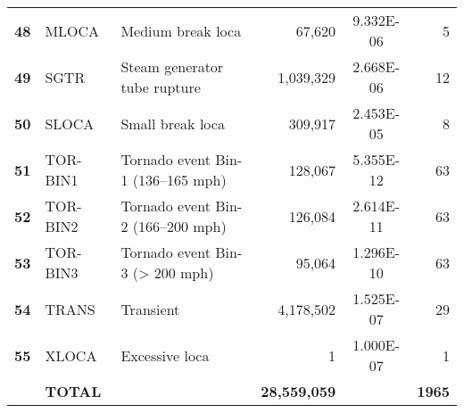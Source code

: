 \begin{longtable}{@{}lllrSr@{}}
\textbf{48} & MLOCA            & Medium break \acrshort{loca} & 67,620    & 9.332E-06 & 5  \\
\textbf{49} & SGTR             & Steam generator tube rupture & 1,039,329 & 2.668E-06 & 12 \\
\textbf{50} & SLOCA            & Small break \acrshort{loca} & 309,917   & 2.453E-05 & 8  \\
\textbf{51} & TOR-BIN1         & Tornado event Bin-1 (136--165 mph) & 128,067   & 5.355E-12 & 63 \\
\textbf{52} & TOR-BIN2         & Tornado event Bin-2 (166--200 mph) & 126,084   & 2.614E-11 & 63 \\
\textbf{53} & TOR-BIN3         & Tornado event Bin-3 (> 200 mph) & 95,064    & 1.296E-10 & 63 \\
\textbf{54} & TRANS            & Transient & 4,178,502 & 1.525E-07 & 29 \\
\textbf{55} & XLOCA            & Excessive \acrshort{loca} & 1         & 1.000E-07 & 1  \\
\textbf{}   & \textbf{TOTAL}   & & \textbf{28,559,059} & & \textbf{1965} \\* \bottomrule

\end{longtable}
